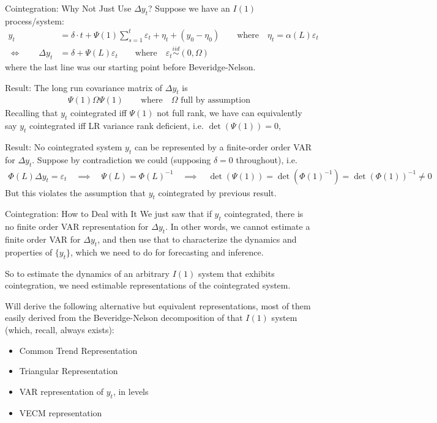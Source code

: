 \documentclass[aspectratio=169, handout]{beamer}
\newcommand{\iid}{\overset{iid}{\sim}}
\begin{document}
{\scriptsize
\begin{frame}{Cointegration: Why Not Just Use $\Delta y_t$?}
Suppose we have an $I(1)$ process/system:
\begin{align*}
  y_t
  &=
  \delta \cdot t
  +
  \Psi(1)
  \sum_{s=1}^t
  \varepsilon_t
  +
  \eta_t
  +
  (y_0-\eta_0)
  \qquad\text{where}\quad
  \eta_t
  =
  \alpha(L)\varepsilon_t
  \\
  \iff\qquad
  \Delta y_t
  &= \delta + \Psi(L)\varepsilon_t
  \qquad\text{where}\quad
  \varepsilon_t
  \iid (0,\Omega)
\end{align*}
where the last line was our starting point before
Beveridge-Nelson.

\pause
\alert{Result}:
The long run covariance matrix of $\Delta y_t$ is
\begin{align*}
  \Psi(1)\Omega\Psi(1)
  \qquad \text{where}\quad
  \text{$\Omega$ full by assumption}
\end{align*}
Recalling that $y_t$ cointegrated iff $\Psi(1)$ not full rank, we have
can equivalently say $y_t$ \alert{cointegrated} iff
\alert{LR variance rank deficient}, i.e. $\det(\Psi(1))=0$,

\pause
\alert{Result}:
No cointegrated system $y_t$ can be represented by a finite-order order
VAR for $\Delta y_t$.
Suppose by contradiction we could (supposing $\delta=0$ throughout), i.e.
\begin{align*}
  \Phi(L) \Delta y_t = \varepsilon_t
  \quad\implies\quad
  \Psi(L) = \Phi(L)^{-1}
  \quad\implies\quad
  \det(\Psi(1)) = \det(\Phi(1)^{-1}) = \det(\Phi(1))^{-1} \neq 0
\end{align*}
But this violates the assumption that $y_t$ cointegrated by previous
result.
\end{frame}
}

{\footnotesize
\begin{frame}{Cointegration: How to Deal with It}
We just saw that if $y_t$ cointegrated, there is no finite order VAR
representation for $\Delta y_t$.
In other words, we cannot estimate a finite order VAR for $\Delta y_t$,
and then use that to characterize the dynamics and properties of
$\{y_t\}$, which we need to do for forecasting and inference.

\pause
So to estimate the dynamics of an arbitrary $I(1)$ system that exhibits
\alert{cointegration}, we need \alert{estimable} representations of the
cointegrated system.

\pause
Will derive the following alternative but equivalent representations,
most of them easily derived from the Beveridge-Nelson decomposition of
that $I(1)$ system (which, recall, always exists):
\begin{itemize}
  \item Common Trend Representation
  \item Triangular Representation
  \item VAR representation of $y_t$, in levels
  \item VECM representation
\end{itemize}
\end{frame}
}
\end{document}
